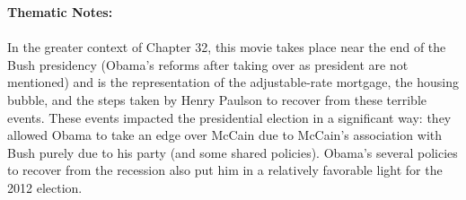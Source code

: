 \documentclass{article}
\begin{document}
    \textbf{Thematic Notes:} \\~\\
    In the greater context of Chapter 32, this movie takes place near the end of the Bush presidency (Obama's reforms after taking over as president are not mentioned) and is the representation of the adjustable-rate mortgage, the housing bubble, and the steps taken by Henry Paulson to recover from these terrible events. These events impacted the presidential election in a significant way: they allowed Obama to take an edge over McCain due to McCain's association with Bush purely due to his party (and some shared policies). Obama's several policies to recover from the recession also put him in a relatively favorable light for the 2012 election.

    
\end{document}
